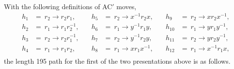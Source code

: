 With the following definitions of AC$'$ moves, 
\[
\begin{aligned}
h_1 &= \ r_2 \rightarrow r_2 r_1, & \quad h_5 &= \ r_2 \rightarrow x^{-1} r_2 x, & \quad h_9 &= \ r_2 \rightarrow x r_2 x^{-1}, \\
h_2 &= \ r_1 \rightarrow r_1 r_2^{-1}, & \quad h_6 &= \ r_1 \rightarrow y^{-1} r_1 y, & \quad h_{10} &= \ r_1 \rightarrow y r_1 y^{-1}, \\
h_3 &= \ r_2 \rightarrow r_2 r_1^{-1}, & \quad h_7 &= \ r_2 \rightarrow y^{-1} r_2 y, & \quad h_{11} &= \ r_2 \rightarrow y r_2 y^{-1}, \\
h_4 &= \ r_1 \rightarrow r_1 r_2, & \quad h_8 &= \ r_1 \rightarrow x r_1 x^{-1}, & \quad h_{12} &= \ r_1 \rightarrow x^{-1} r_1 x, \\
\end{aligned}
\]
the length 195 path for the first of the two presentations above is as follows.
